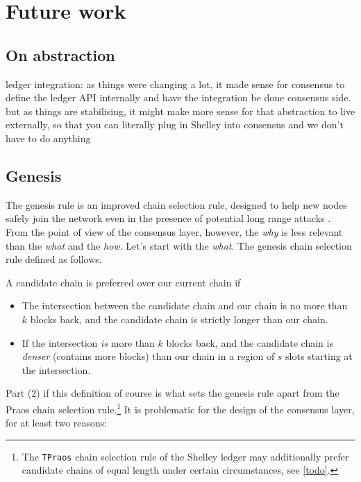 \chapter{Future work}

\section{On abstraction}

ledger integration: as things were changing a lot, it made sense for consensus to define the ledger API internally and have the integration be done consensus side. but as things are stabilising, it might make more sense for that abstraction to live externally, so that you can literally plug in Shelley into consensus and we don't have to do anything

\section{Genesis}
\label{future:genesis}

The genesis rule is an improved chain selection rule, designed to help new nodes
safely join the network even in the presence of potential long range attacks
\cite{cryptoeprint:2018:378}. From the point of view of the consensus layer,
however, the \emph{why} is less relevant than the \emph{what} and the
\emph{how}. Let's start with the \emph{what}. The genesis chain selection
rule defined as follows.

\begin{definition}
A candidate chain is preferred over our current chain if

\begin{itemize}
\item The intersection between the candidate chain and our chain is no more
than $k$ blocks back, and the candidate chain is strictly longer than our
chain.

\item If the intersection \emph{is} more than $k$ blocks back, and the
candidate chain is \emph{denser} (contains more blocks) than our chain in
a region of $s$ slots starting at the intersection.
\end{itemize}
\end{definition}

Part (2) if this definition of course is what sets the genesis rule apart
from the Praos chain selection rule.\footnote{The \lstinline!TPraos! chain
selection rule of the Shelley ledger may additionally prefer candidate chains
of equal length under certain circumstances, see \cref{todo}.} It is problematic
for the design of the consensus layer, for at least two reasons:

